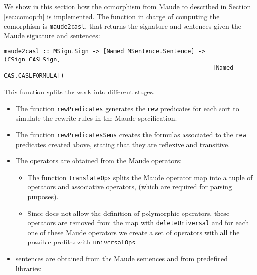 
We show in this section how the comorphism
from Maude to \CASL described in Section \ref{sec:comoprh} is implemented.
The function in charge of computing the comorphism is
\verb"maude2casl", that returns the \CASL signature and sentences
given the Maude signature and sentences:

{\codesize
\begin{verbatim}
maude2casl :: MSign.Sign -> [Named MSentence.Sentence] -> (CSign.CASLSign, 
                                                           [Named CAS.CASLFORMULA])
\end{verbatim}
}

This function splits the work into different stages:

\begin{itemize}

\item
The function \verb"rewPredicates" generates the \verb"rew" predicates for
each sort to simulate the rewrite rules in the Maude specification.

\item
The function \verb"rewPredicatesSens" creates the formulas associated to
the \verb"rew" predicates created above, stating that they are reflexive
and transitive.

\item
The \CASL operators are obtained from the Maude operators:

\begin{itemize}
\item
The function \verb"translateOps" splits the Maude operator map
into a tuple of \CASL operators and \CASL associative operators,
(which are required for parsing purposes).

\item
Since \CASL does not allow the definition
of polymorphic operators, these operators are removed from the map
with \verb"deleteUniversal" and for each one of these Maude operators we
create a set of \CASL operators with all the possible profiles with
\verb"universalOps".

\end{itemize}

\item \CASL sentences are obtained from the Maude sentences and from
predefined \CASL libraries:


\end{itemize}
